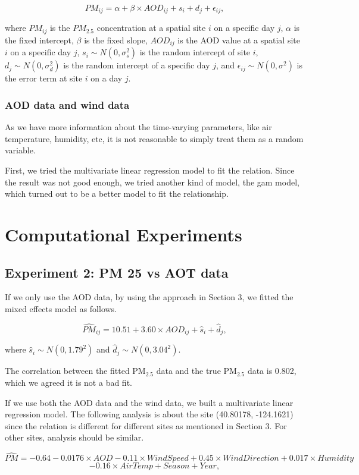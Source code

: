 \documentclass[10pt]{article}
\begin{document}
$$PM_{ij} = \alpha + \beta\times AOD_{ij} + s_i + d_j+ \epsilon_{ij}, $$

where $PM_{ij}$ is the $PM_{2.5}$ concentration at a spatial site $i$ on a specific day $j$, $\alpha$ is the fixed intercept, $\beta$ is the fixed slope, $AOD_{ij}$ is the AOD value at a spatial site $i$ on a specific day $j$, $s_i\sim N(0, \sigma_s^2)$ is the random intercept of site $i$, $d_j\sim N(0, \sigma_d^2)$ is the random intercept of a specific day $j$, and $\epsilon_{ij}\sim N(0, \sigma^2)$ is the error term at site $i$ on a day $j$.

\subsubsection{AOD data and wind data}
As we have more information about the time-varying parameters, like air temperature, humidity, etc, it is not reasonable to simply treat them as a random variable. 

First, we tried the multivariate linear regression model to fit the relation. Since the result was not good enough, we tried another kind of model, the gam model, which turned out to be a better model to fit the relationship.

\section{Computational Experiments}

\subsection{Experiment 2: PM 25 vs AOT data}
If we only use the AOD data, by using the approach in Section 3, we fitted the mixed effects model as follows.

$$\hat{PM}_{ij} = 10.51 + 3.60\times AOD_{ij} + \hat{s}_i + \hat{d}_j, $$

where $\hat{s}_i\sim N(0, 1.79^2)$ and $\hat{d}_j\sim N(0, 3.04^2)$. 

The correlation between the fitted PM$_{2.5}$ data and the true PM$_{2.5}$ data is 0.802, which we agreed it is not a bad fit. 

If we use both the AOD data and the wind data, we built a multivariate linear regression model. 
The following analysis is about the site (40.80178, -124.1621) since the relation is different for different sites as mentioned in Section 3. For other sites, analysis should be similar. 

$$\hat{PM} = -0.64 - 0.0176\times AOD - 0.11\times WindSpeed + 0.45\times WindDirection + 0.017\times Humidity$$
$$ - 0.16\times AirTemp + Season + Year, $$
\end{document}
